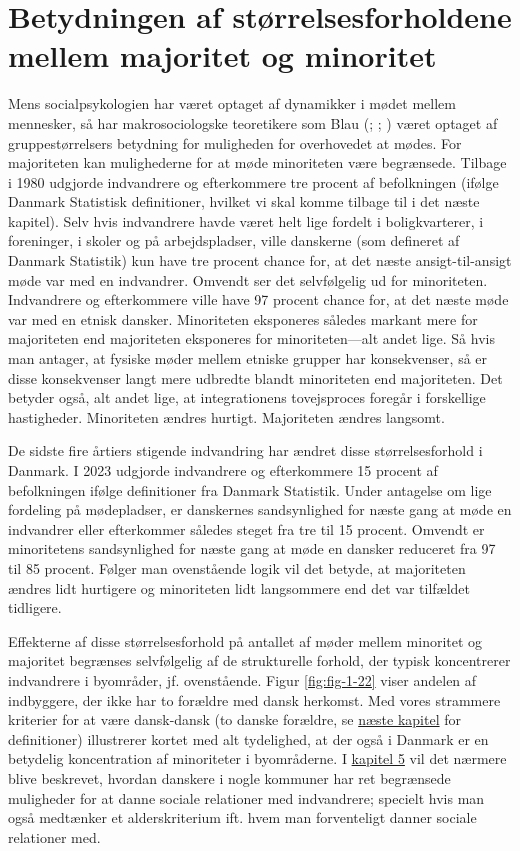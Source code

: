 \documentclass[
]{book}
\begin{document}
\section{Betydningen af størrelsesforholdene mellem majoritet og minoritet}\label{betydningen-af-stuxf8rrelsesforholdene-mellem-majoritet-og-minoritet}

Mens socialpsykologien har været optaget af dynamikker i mødet mellem mennesker, så har makrosociologske teoretikere som Blau (; ; ) været optaget af gruppestørrelsers betydning for muligheden for overhovedet at mødes. For majoriteten kan mulighederne for at møde minoriteten være begrænsede. Tilbage i 1980 udgjorde indvandrere og efterkommere tre procent af befolkningen (ifølge Danmark Statistisk definitioner, hvilket vi skal komme tilbage til i det næste kapitel). Selv hvis indvandrere havde været helt lige fordelt i boligkvarterer, i foreninger, i skoler og på arbejdspladser, ville danskerne (som defineret af Danmark Statistik) kun have tre procent chance for, at det næste ansigt-til-ansigt møde var med en indvandrer. Omvendt ser det selvfølgelig ud for minoriteten. Indvandrere og efterkommere ville have 97 procent chance for, at det næste møde var med en etnisk dansker. Minoriteten eksponeres således markant mere for majoriteten end majoriteten eksponeres for minoriteten---alt andet lige. Så hvis man antager, at fysiske møder mellem etniske grupper har konsekvenser, så er disse konsekvenser langt mere udbredte blandt minoriteten end majoriteten. Det betyder også, alt andet lige, at integrationens tovejsproces foregår i forskellige hastigheder. Minoriteten ændres hurtigt. Majoriteten ændres langsomt.

De sidste fire årtiers stigende indvandring har ændret disse størrelsesforhold i Danmark. I 2023 udgjorde indvandrere og efterkommere 15 procent af befolkningen ifølge definitioner fra Danmark Statistik. Under antagelse om lige fordeling på mødepladser, er danskernes sandsynlighed for næste gang at møde en indvandrer eller efterkommer således steget fra tre til 15 procent. Omvendt er minoritetens sandsynlighed for næste gang at møde en dansker reduceret fra 97 til 85 procent. Følger man ovenstående logik vil det betyde, at majoriteten ændres lidt hurtigere og minoriteten lidt langsommere end det var tilfældet tidligere.

Effekterne af disse størrelsesforhold på antallet af møder mellem minoritet og majoritet begrænses selvfølgelig af de strukturelle forhold, der typisk koncentrerer indvandrere i byområder, jf. ovenstående. Figur \ref{fig:fig-1-22} viser andelen af indbyggere, der ikke har to forældre med dansk herkomst. Med vores strammere kriterier for at være dansk-dansk (to danske forældre, se \hyperref[kap2]{næste kapitel} for definitioner) illustrerer kortet med alt tydelighed, at der også i Danmark er en betydelig koncentration af minoriteter i byområderne. I \hyperref[kap5]{kapitel 5} vil det nærmere blive beskrevet, hvordan danskere i nogle kommuner har ret begrænsede muligheder for at danne sociale relationer med indvandrere; specielt hvis man også medtænker et alderskriterium ift. hvem man forventeligt danner sociale relationer med.
\end{document}
